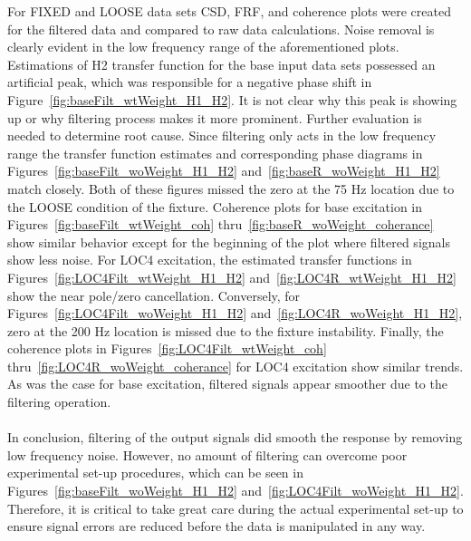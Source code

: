 \documentclass[paper=a4, fontsize=12pt]{scrartcl} %
\begin{document}
For FIXED and LOOSE data sets CSD, FRF, and coherence plots were created for the filtered data and compared to raw data calculations. Noise removal is clearly evident in the low frequency range of the aforementioned plots. Estimations of H2 transfer function for the base input data sets possessed an artificial peak, which was responsible for a negative phase shift in Figure~\ref{fig:baseFilt_wtWeight_H1_H2}. It is not clear why this peak is showing up or why filtering process makes it more prominent. Further evaluation is needed to determine root cause. Since filtering only acts in the low frequency range the transfer function estimates and corresponding phase diagrams in Figures~\ref{fig:baseFilt_woWeight_H1_H2} and~\ref{fig:baseR_woWeight_H1_H2} match closely. Both of these figures missed the zero at the 75 Hz location due to the LOOSE condition of the fixture. Coherence plots for base excitation in Figures~\ref{fig:baseFilt_wtWeight_coh} thru~\ref{fig:baseR_woWeight_coherance} show similar behavior except for the beginning of the plot where filtered signals show less noise. For LOC4 excitation, the estimated transfer functions in Figures~\ref{fig:LOC4Filt_wtWeight_H1_H2} and~\ref{fig:LOC4R_wtWeight_H1_H2} show the near pole/zero cancellation. Conversely, for Figures~\ref{fig:LOC4Filt_woWeight_H1_H2} and~\ref{fig:LOC4R_woWeight_H1_H2}, zero at the 200 Hz location is missed due to the fixture instability. Finally, the coherence plots in Figures~\ref{fig:LOC4Filt_wtWeight_coh} thru~\ref{fig:LOC4R_woWeight_coherance} for LOC4 excitation show similar trends. As was the case for base excitation, filtered signals appear smoother due to the filtering operation. 
\\
\\ 
In conclusion, filtering of the output signals did smooth the response by removing low frequency noise. However, no amount of filtering can overcome poor experimental set-up procedures, which can be seen in Figures~\ref{fig:baseFilt_woWeight_H1_H2} and~\ref{fig:LOC4Filt_woWeight_H1_H2}. Therefore, it is critical to take great care during the actual experimental set-up to ensure signal errors are reduced before the data is manipulated in any way.
%
%
%
%
\end{document}
